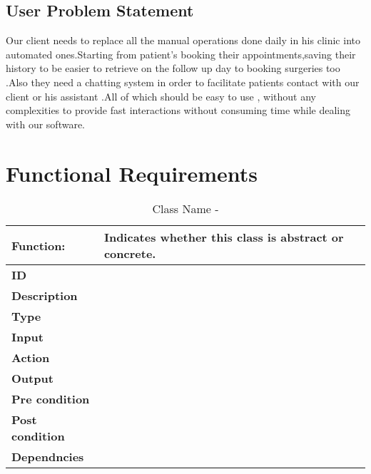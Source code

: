 \documentclass[]{article}
\begin{document}
\subsection{ User Problem Statement}
Our client needs to replace all the manual operations done daily in his clinic into automated ones.Starting from patient's booking their appointments,saving their history to be easier to retrieve on the follow up day to booking surgeries too .Also they need a chatting system in order to facilitate patients contact with our client or his assistant .All of which should be easy to use , without any complexities to provide fast interactions without consuming time while dealing with our software.

\section{Functional Requirements}

\begin{table}[h]
\caption{Class Name - }
\label{tab:my-table}
\begin{tabular}{|p{}|p{}|}
\hline
\textbf{Function:} & Indicates whether this class is abstract or concrete.
\\ \hline
\textbf{ID}  &            

\\ \hline
\textbf{Description}    &                                                                     
\\ \hline
\textbf{Type}    &         

\\ \hline
\textbf{Input}        & 


\\ \hline
\textbf{Action}            & 

\\ \hline
\textbf{Output}            & 

\\ \hline
\textbf{Pre condition}           &   

\\ \hline
\textbf{Post condition}           & 


\\ \hline
\textbf{Dependncies}           & 
\\ \hline
\end{tabular}
\end{table}
\end{document}
